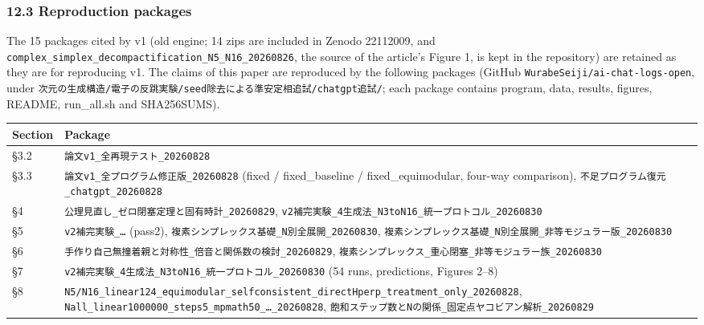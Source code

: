 \documentclass[
  10pt,
  a4paper,
]{article}
\newcounter{none} %
\begin{document}
\subsubsection{12.3 Reproduction packages}\label{reproduction-packages}

The 15 packages cited by v1 (old engine; 14 zips are included in Zenodo
22112009, and
\texttt{complex\_simplex\_decompactification\_N5\_N16\_20260826}, the
source of the article's Figure 1, is kept in the repository) are
retained as they are for reproducing v1. The claims of this paper are
reproduced by the following packages (GitHub
\texttt{WurabeSeiji/ai-chat-logs-open}, under
\texttt{次元の生成構造/電子の反跳実験/seed除去による準安定相追試/chatgpt追試/};
each package contains program, data, results, figures, README,
run\_all.sh and SHA256SUMS).

{\def\LTcaptype{none} %
\begin{longtable}[]{@{}
  >{\raggedright\arraybackslash}p{}
  >{\raggedright\arraybackslash}p{}@{}}
\toprule\noalign{}
\begin{minipage}[b]{\linewidth}\raggedright
Section
\end{minipage} & \begin{minipage}[b]{\linewidth}\raggedright
Package
\end{minipage} \\
\midrule\noalign{}
\endhead
\bottomrule\noalign{}
\endlastfoot
§3.2 & \texttt{論文v1\_全再現テスト\_20260828} \\
§3.3 & \texttt{論文v1\_全プログラム修正版\_20260828} (fixed /
fixed\_baseline / fixed\_equimodular, four-way comparison),
\texttt{不足プログラム復元\_chatgpt\_20260828} \\
§4 & \texttt{公理見直し\_ゼロ閉塞定理と固有時計\_20260829},
\texttt{v2補完実験\_4生成法\_N3toN16\_統一プロトコル\_20260830} \\
§5 & \texttt{v2補完実験\_…} (pass2),
\texttt{複素シンプレックス基礎\_N別全展開\_20260830},
\texttt{複素シンプレックス基礎\_N別全展開\_非等モジュラー版\_20260830} \\
§6 & \texttt{手作り自己無撞着親と対称性\_倍音と関係数の検討\_20260829},
\texttt{複素シンプレックス\_重心閉塞\_非等モジュラー族\_20260830} \\
§7 & \texttt{v2補完実験\_4生成法\_N3toN16\_統一プロトコル\_20260830} (54
runs, predictions, Figures 2--8) \\
§8 &
\texttt{N5/N16\_linear124\_equimodular\_selfconsistent\_directHperp\_treatment\_only\_20260828},
\texttt{Nall\_linear1000000\_steps5\_mpmath50\_…\_20260828},
\texttt{飽和ステップ数とNの関係\_固定点ヤコビアン解析\_20260829} \\
\end{longtable}
}
\end{document}
